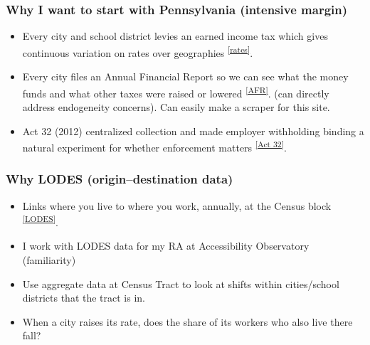 \documentclass[xcolor = x11names, compress, aspectratio = 169]{beamer}
\newcommand{\src}[2]{\textsuperscript{\href{#1}{\footnotesize[#2]}}}
\begin{document}
\begin{frame}
\frametitle{Why I want to start with Pennsylvania (intensive margin)}
    \begin{itemize}\setlength{\itemsep}{0.3cm}
        \item Every city and school district levies an earned income
        tax which gives continuous variation on rates over geographies
        \src{https://dced.pa.gov/local-government/local-income-tax-information/psd-codes-and-eit-rates/}{rates}.
        \item Every city files an Annual Financial Report so we can
        see what the money funds and what other taxes were raised or lowered
        \src{https://apps.dced.pa.gov/munstats-public/ReportInformation2.aspx?report=mAfrForm}{AFR}. (can directly address endogeneity concerns). Can easily make a scraper for this site.
        \item Act 32 (2012) centralized collection and made employer
        withholding binding a natural experiment for whether
        enforcement matters
        \src{https://business.pa.gov/operate/hiring-workers/act-32-and-local-earned-income-tax/}{Act 32}.
    \end{itemize}
\end{frame}

\begin{frame}
\frametitle{Why LODES (origin--destination data)}
    \begin{itemize}\setlength{\itemsep}{0.3cm}
        \item Links where you live to where you work, annually, at
        the Census block
        \src{https://lehd.ces.census.gov/data/lodes/LODES8/}{LODES}.
        \item I work with LODES data for my RA at Accessibility Observatory (familiarity)
        \item Use aggregate data at Census Tract to look at shifts within cities/school districts that the tract is in.
        \item When a city raises its rate, does the
        share of its workers who also live there fall?
    \end{itemize}
\end{frame}
\end{document}
